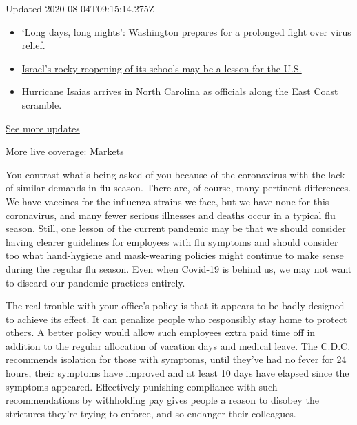 Updated 2020-08-04T09:15:14.275Z

\begin{itemize}
\tightlist
\item
  \href{https://www.nytimes3xbfgragh.onion/2020/08/04/world/coronavirus-covid-19.html?action=click\&pgtype=Article\&state=default\&region=MAIN_CONTENT_1\&context=storylines_live_updates\#link-6b644638}{`Long
  days, long nights': Washington prepares for a prolonged fight over
  virus relief.}
\item
  \href{https://www.nytimes3xbfgragh.onion/2020/08/04/world/coronavirus-covid-19.html?action=click\&pgtype=Article\&state=default\&region=MAIN_CONTENT_1\&context=storylines_live_updates\#link-7af9fca0}{Israel's
  rocky reopening of its schools may be a lesson for the U.S.}
\item
  \href{https://www.nytimes3xbfgragh.onion/2020/08/04/world/coronavirus-covid-19.html?action=click\&pgtype=Article\&state=default\&region=MAIN_CONTENT_1\&context=storylines_live_updates\#link-33bf9168}{Hurricane
  Isaias arrives in North Carolina as officials along the East Coast
  scramble.}
\end{itemize}

\href{https://www.nytimes3xbfgragh.onion/2020/08/04/world/coronavirus-covid-19.html?action=click\&pgtype=Article\&state=default\&region=MAIN_CONTENT_1\&context=storylines_live_updates}{See
more updates}

More live coverage:
\href{https://www.nytimes3xbfgragh.onion/live/2020/08/03/business/stock-market-today-coronavirus?action=click\&pgtype=Article\&state=default\&region=MAIN_CONTENT_1\&context=storylines_live_updates}{Markets}

You contrast what's being asked of you because of the coronavirus with
the lack of similar demands in flu season. There are, of course, many
pertinent differences. We have vaccines for the influenza strains we
face, but we have none for this coronavirus, and many fewer serious
illnesses and deaths occur in a typical flu season. Still, one lesson of
the current pandemic may be that we should consider having clearer
guidelines for employees with flu symptoms and should consider too what
hand-hygiene and mask-wearing policies might continue to make sense
during the regular flu season. Even when Covid-19 is behind us, we may
not want to discard our pandemic practices entirely.

The real trouble with your office's policy is that it appears to be
badly designed to achieve its effect. It can penalize people who
responsibly stay home to protect others. A better policy would allow
such employees extra paid time off in addition to the regular allocation
of vacation days and medical leave. The C.D.C. recommends isolation for
those with symptoms, until they've had no fever for 24 hours, their
symptoms have improved and at least 10 days have elapsed since the
symptoms appeared. Effectively punishing compliance with such
recommendations by withholding pay gives people a reason to disobey the
strictures they're trying to enforce, and so endanger their colleagues.

